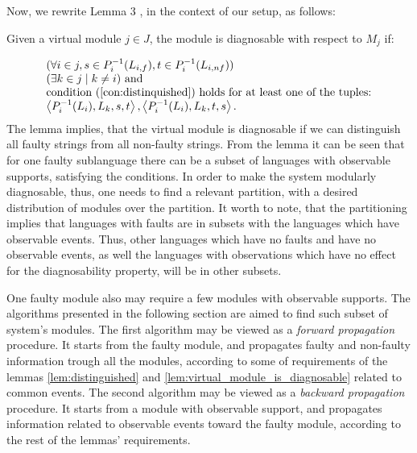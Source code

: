 \documentclass[a4paper, 10pt, conference]{ieeeconf}
\begin{document}
Now, we rewrite Lemma 3 \cite{myadzelets_virtual_2013}, in the context of our
setup, as follows:
\begin{lemma}
\label{lem:virtual_module_is_diagnosable}
Given a virtual module $j \in J$, the module is diagnosable with respect to
$M_j$ if:
\end{lemma}
\begin{equation}
	\begin{array}{l}
		(\forall i \in j, 
			s \in P_i^{-1}(L_{i,f}), 
			t \in P_i^{-1}(L_{i,nf}))
		\\
		(\exists k \in j \mid k \neq i) \textrm{ and }
		\\
		\textrm{condition (\ref{con:distinquished}) holds for at least one of
		the tuples:}
		\\
		\left<P_i^{-1}(L_i), L_k, s, t \right>,
		\left<P_i^{-1}(L_i), L_k, t, s \right>.
	\end{array}
\end{equation}
The lemma implies, that the virtual module is diagnosable if we can distinguish
all faulty strings from all non-faulty strings. 
From the lemma it can be seen that for one faulty sublanguage there can be a
subset of languages with observable supports, satisfying the conditions. In
order to make the system modularly diagnosable, thus, one needs to find a
relevant partition, with a desired distribution of modules over the partition.
It worth to note, that the partitioning implies that languages with faults are
in subsets with the languages which have observable events. Thus, other
languages which have no faults and have no observable events, as well the
languages with observations which have no effect for the diagnosability
property, will be in other subsets.

One faulty module also may require a few modules with observable supports.
The algorithms presented in the following section are aimed to find such subset
of system's modules. The first algorithm may be viewed as a \emph{forward
propagation} procedure. It starts from the faulty module, and propagates faulty
and non-faulty information trough all the modules, according to some
of requirements of the lemmas \ref{lem:distinguished} and
\ref{lem:virtual_module_is_diagnosable} related to common events. The second
algorithm may be viewed as a \emph{backward propagation} procedure. It starts
from a module with observable support, and propagates information related to
observable events toward the faulty module, according to the rest of the lemmas'
requirements.
\end{document}
